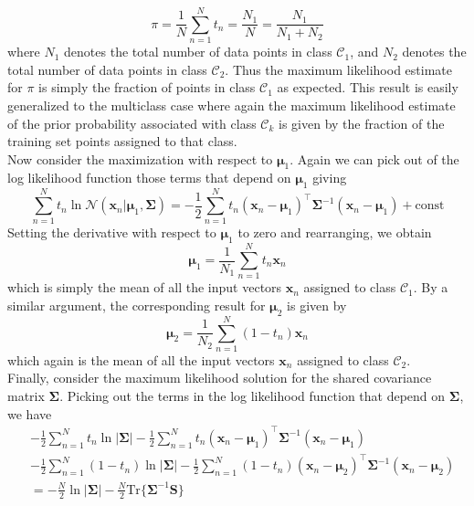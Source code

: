 \documentclass[twoside]{article}
\begin{document}
\begin{equation*}
    \pi = \frac{1}{N}\sum\limits_{n = 1}^{N}t_n = \frac{N_1}{N}=\frac{N_1}{N_1 + N_2}
\end{equation*}
where $N_1$ denotes the total number of data points in class $\mathcal{C}_1$, and $N_2$ denotes the total number of data points in class $\mathcal{C}_2$. Thus the maximum likelihood estimate for $\pi$ is simply the fraction of points in class $\mathcal{C}_1$ as expected. This result is easily generalized to the multiclass case where again the maximum likelihood estimate of the prior probability associated with class $\mathcal{C}_k$ is given by the fraction of the training set points assigned to that class.\\
Now consider the maximization with respect to $\boldsymbol{\mu}_1$. Again we can pick out of the log likelihood function those terms that depend on $\boldsymbol{\mu}_1$ giving
\begin{equation*}
    \sum\limits_{n = 1}^{N}t_n\ln{\mathcal{N}(\boldsymbol{x}_n|\boldsymbol{\mu}_1, \boldsymbol{\Sigma})} = -\frac{1}{2}\sum\limits_{n = 1}^{N}t_n(\boldsymbol{x}_n - \boldsymbol{\mu}_1)^\intercal\boldsymbol{\Sigma}^{-1}(\boldsymbol{x}_n - \boldsymbol{\mu}_1) + \text{const}
\end{equation*}
Setting the derivative with respect to $\boldsymbol{\mu}_1$ to zero and rearranging, we obtain
\begin{equation*}
    \boldsymbol{\mu}_1 = \frac{1}{N_1}\sum\limits_{n = 1}^{N}t_n\boldsymbol{x}_n
\end{equation*}
which is simply the mean of all the input vectors $\boldsymbol{x}_n$ assigned to class $\mathcal{C}_1$. By a similar argument, the corresponding result for $\boldsymbol{\mu}_2$ is given by
\begin{equation*}
    \boldsymbol{\mu}_2 = \frac{1}{N_2}\sum\limits_{n = 1}^{N}(1 - t_n)\boldsymbol{x}_n
\end{equation*}
which again is the mean of all the input vectors $\boldsymbol{x}_n$ assigned to class $\mathcal{C}_2$.\\
Finally, consider the maximum likelihood solution for the shared covariance matrix $\boldsymbol{\Sigma}$. Picking out the terms in the log likelihood function that depend on $\boldsymbol{\Sigma}$, we have
\begin{equation*}
    \begin{aligned}
        &-\frac{1}{2}\sum\limits_{n = 1}^{N}t_n\ln{|\boldsymbol{\Sigma}|} - \frac{1}{2}\sum\limits_{n = 1}^{N}t_n(\boldsymbol{x}_n - \boldsymbol{\mu}_1)^\intercal\boldsymbol{\Sigma}^{-1}(\boldsymbol{x}_n - \boldsymbol{\mu}_1)\\
        &-\frac{1}{2}\sum\limits_{n = 1}^{N}( 1 - t_n)\ln{|\boldsymbol{\Sigma}|} - \frac{1}{2}\sum\limits_{n = 1}^{N}(1 - t_n)(\boldsymbol{x}_n - \boldsymbol{\mu}_2)^\intercal\boldsymbol{\Sigma}^{-1}(\boldsymbol{x}_n - \boldsymbol{\mu}_2)\\
        &= -\frac{N}{2}\ln{|\boldsymbol{\Sigma}|} - \frac{N}{2}\text{Tr}\{\boldsymbol{\Sigma}^{-1}\textbf{S}\}
    \end{aligned}
\end{equation*}
\end{document}
